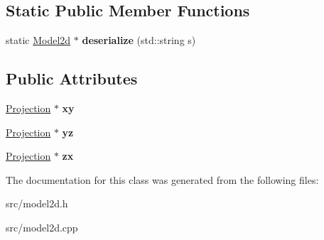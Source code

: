 \subsection*{Static Public Member Functions}
\begin{DoxyCompactItemize}
\item 
\mbox{\label{class_model2d_aa3c8399ef5cf86bb176b111c132f30b7}} 
static \mbox{\hyperlink{class_model2d}{Model2d}} $\ast$ {\bfseries deserialize} (std\+::string s)
\end{DoxyCompactItemize}
\subsection*{Public Attributes}
\begin{DoxyCompactItemize}
\item 
\mbox{\label{class_model2d_ad335c0d9899b23996a3f11e61be1d431}} 
\mbox{\hyperlink{class_projection}{Projection}} $\ast$ {\bfseries xy}
\item 
\mbox{\label{class_model2d_a4d012de876b8bb089bd226e41270df25}} 
\mbox{\hyperlink{class_projection}{Projection}} $\ast$ {\bfseries yz}
\item 
\mbox{\label{class_model2d_a6c459c26e4c89bbc11ac0149ea07b997}} 
\mbox{\hyperlink{class_projection}{Projection}} $\ast$ {\bfseries zx}
\end{DoxyCompactItemize}


The documentation for this class was generated from the following files\+:\begin{DoxyCompactItemize}
\item 
src/model2d.\+h\item 
src/model2d.\+cpp\end{DoxyCompactItemize}
